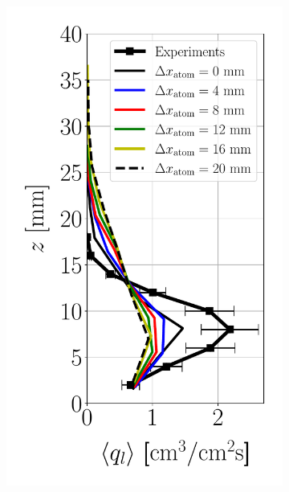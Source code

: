 \begin{figure}[h!]
\flushleft
\begin{subfigure}[b]{0.2\textwidth}
	\flushleft
   \includegraphics[scale=0.35]{./part2_developments/figures_ch6_lagrangian_JICF/params_dx_atom/profiles/flux_along_z}
\end{subfigure}
\hspace*{0.5in}
\begin{subfigure}[b]{0.2\textwidth}
	\flushleft

\end{subfigure}
\end{figure}
